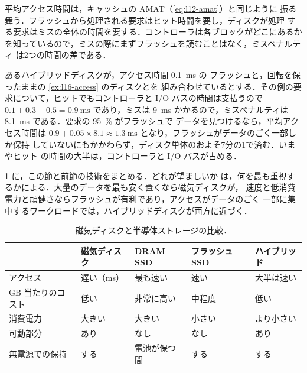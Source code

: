 \documentclass[../main.tex]{subfiles}
\begin{document}
平均アクセス時間は，キャッシュの AMAT（\cref{eq:l12-amat}）と同じように
振る舞う．フラッシュから処理される要求はヒット時間を要し，ディスクが処理
する要求はミスの全体の時間を要する．コントローラは各ブロックがどこにあるか
を知っているので，ミスの際にまずフラッシュを読むことはなく，ミスペナルティ
は2つの時間の差である．

\begin{example}
  \label{ex:l16-hybrid}
  あるハイブリッドディスクが，アクセス時間 \SI{0.1}{\milli\second} の
  フラッシュと，回転を保ったままの \cref{ex:l16-access} のディスクとを
  組み合わせているとする．その例の要求について，ヒットでもコントローラと
  I/O バスの時間は支払うので $0.1 + 0.3 + 0.5 = \SI{0.9}{\milli\second}$
  であり，ミスは \SI{9}{\milli\second} かかるので，ミスペナルティは
  \SI{8.1}{\milli\second} である．要求の \SI{95}{\percent} がフラッシュで
  データを見つけるなら，平均アクセス時間は $0.9 + 0.05 \times 8.1 \approx
  \SI{1.3}{\milli\second}$ となり，フラッシュがデータのごく一部しか保持
  していないにもかかわらず，ディスク単体のおよそ7分の1で済む．いまやヒット
  の時間の大半は，コントローラと I/O バスが占める．
\end{example}

\cref{tab:l16-compare} に，この節と前節の技術をまとめる．どれが望ましいか
は，何を最も重視するかによる．大量のデータを最も安く置くなら磁気ディスクが，
速度と低消費電力と頑健さならフラッシュが有利であり，アクセスがデータのごく
一部に集中するワークロードでは，ハイブリッドディスクが両方に近づく．

\begin{table}[htbp]
  \centering\small
  \caption{磁気ディスクと半導体ストレージの比較．}
  \label{tab:l16-compare}
  \begin{tabular}{@{}lllll@{}}
    \toprule
                      & 磁気ディスク & DRAM SSD     & フラッシュ SSD & ハイブリッド \\
    \midrule
    アクセス          & 遅い（ms）   & 最も速い     & 速い           & 大半は速い \\
    GB 当たりのコスト & 低い         & 非常に高い   & 中程度         & 低い \\
    消費電力          & 大きい       & 大きい       & 小さい         & より小さい \\
    可動部分          & あり         & なし         & なし           & あり \\
    無電源での保持    & する         & 電池が保つ間 & する           & する \\
    \bottomrule
  \end{tabular}
\end{table}
\end{document}
